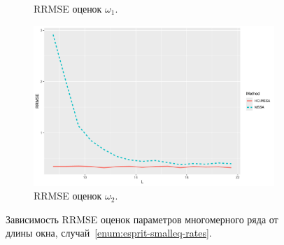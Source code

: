 \documentclass[specialist,
  substylefile=spbu_report.rtx,
subf,href,colorlinks=true, 12pt]{disser}
\theoremstyle{plain}
\theoremstyle{definition}
\theoremstyle{remark}
\begin{document}
\begin{figure}[!ht]
\begin{subfigure}{0.49\linewidth}
    \caption{RRMSE оценок $\omega_1$.}
    \label{fig:freq1_L_small_eq_rates}
  \end{subfigure}
  \begin{subfigure}{0.49\linewidth}
    \includegraphics[width=\linewidth, height=0.19\textheight]{freq2_L_small_eq_rates.pdf}
    \caption{RRMSE оценок $\omega_2$.}
    \label{fig:freq2_L_small_eq_rates}
  \end{subfigure}
  \caption{Зависимость RRMSE оценок параметров многомерного ряда от длины окна,
  случай~\ref{enum:esprit-smalleq-rates}.}
  \label{fig:L_small_eq_rates}
\end{figure}
\end{document}
